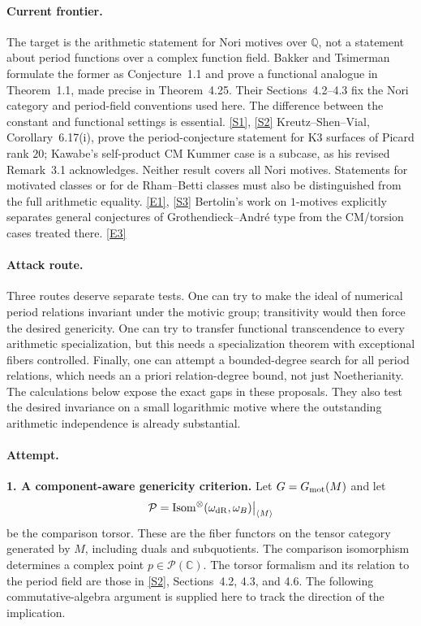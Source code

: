 \documentclass[11pt,a4paper]{article}
\newcommand{\Q}{\mathbb{Q}}
\newcommand{\C}{\mathbb{C}}
\newcommand{\sref}[2]{\hyperlink{source:#1:#2}{[S#2]}}
\newcommand{\eref}[2]{\hyperlink{extra:#1:#2}{[E#2]}}
\numberwithin{equation}{section}
\begin{document}
\paragraph{Current frontier.}
The target is the arithmetic statement for Nori motives over $\Q$, not a
statement about period functions over a complex function field. Bakker and
Tsimerman formulate the former as Conjecture~1.1 and prove a functional
analogue in Theorem~1.1, made precise in Theorem~4.25. Their
Sections~4.2--4.3 fix the Nori category and period-field conventions used
here. The difference between the constant and functional settings is
essential. \sref{49}{1}, \sref{49}{2}
Kreutz--Shen--Vial, Corollary~6.17(i), prove the period-conjecture statement
for K3 surfaces of Picard rank $20$; Kawabe's self-product CM Kummer case
is a subcase, as his revised Remark~3.1 acknowledges. Neither result covers
all Nori motives. Statements for motivated classes or for de Rham--Betti
classes must also be distinguished from the full arithmetic equality.
\eref{49}{1}, \sref{49}{3}
Bertolin's work on $1$-motives explicitly separates general conjectures
of Grothendieck--Andr\'e type from the CM/torsion cases treated there.
\eref{49}{3}

\paragraph{Attack route.}
Three routes deserve separate tests. One can try to make the ideal of
numerical period relations invariant under the motivic group; transitivity
would then force the desired genericity. One can try to transfer functional
transcendence to every arithmetic specialization, but this needs a
specialization theorem with exceptional fibers controlled. Finally, one
can attempt a bounded-degree search for all period relations, which needs
an a priori relation-degree bound, not just Noetherianity. The calculations
below expose the exact gaps in these proposals. They also test the desired
invariance on a small logarithmic motive where the outstanding arithmetic
independence is already substantial.

\paragraph{Attempt.}
\textbf{1. A component-aware genericity criterion.}
Let $G=G_{\rm mot}(M)$ and let
\[
 \mathcal P=\operatorname{Isom}^{\otimes}
       (\omega_{\rm dR},\omega_B)\big|_{\langle M\rangle}
\]
be the comparison torsor. These are the fiber functors on the tensor
category generated by $M$, including duals and subquotients. The comparison
isomorphism determines a complex point $p\in\mathcal P(\C)$.
The torsor formalism and its relation to the period field are those in
\sref{49}{2}, Sections~4.2, 4.3, and 4.6. The following commutative-algebra
argument is supplied here to track the direction of the implication.
\end{document}
